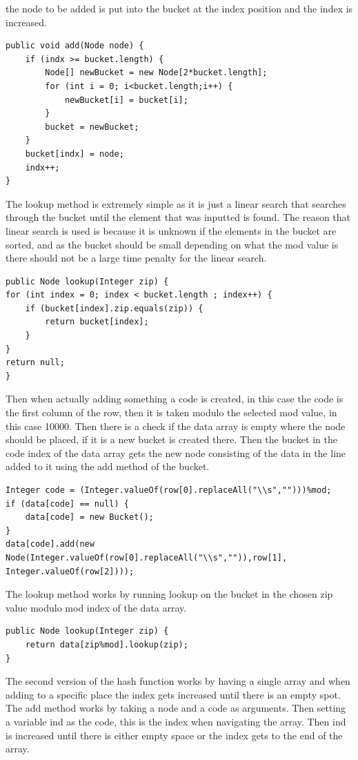 \documentclass[a4paper,11pt]{article}
\begin{document}
the node to be added is put into the bucket at the index position and the index is increased. 
\begin{verbatim}
public void add(Node node) {
    if (indx >= bucket.length) {
        Node[] newBucket = new Node[2*bucket.length];
        for (int i = 0; i<bucket.length;i++) {
            newBucket[i] = bucket[i];
        }
        bucket = newBucket;
    }
    bucket[indx] = node;
    indx++;
}
\end{verbatim}
The lookup method is extremely simple as it is just a linear search that searches through the bucket until the element that was inputted is found. The reason that linear search is used is because it is unknown if the 
elements in the bucket are sorted, and as the bucket should be small depending on what the mod value is there should not be a large time penalty for the linear search.
\begin{verbatim}
public Node lookup(Integer zip) {
for (int index = 0; index < bucket.length ; index++) {
    if (bucket[index].zip.equals(zip)) {
        return bucket[index];
    }
}
return null;
}
\end{verbatim}
Then when actually adding something a code is created, in this case the code is the first column of the row, then it is taken modulo the selected mod value, in this case 10000. Then there is a check if the data array is empty where the node should be placed, if it is a new bucket is created there. Then 
the bucket in the code index of the data array gets the new node consisting of the data in the line added to it using the add method of the bucket. 
\begin{verbatim}
Integer code = (Integer.valueOf(row[0].replaceAll("\\s","")))%mod;
if (data[code] == null) {
    data[code] = new Bucket();
}
data[code].add(new Node(Integer.valueOf(row[0].replaceAll("\\s","")),row[1], Integer.valueOf(row[2])));
\end{verbatim} 
The lookup method works by running lookup on the bucket in the chosen zip value modulo mod index of the data array. 
\begin{verbatim}
public Node lookup(Integer zip) {
    return data[zip%mod].lookup(zip);
}
\end{verbatim}
The second version of the hash function works by having a single array and when adding to a specific place the index gets increased until there is an empty spot.
The add method works by taking a node and a code as arguments. Then setting a variable ind as the code, this is the index when navigating the array. Then ind is increased until there is either empty space or the index gets to the end of the array.
\end{document}
